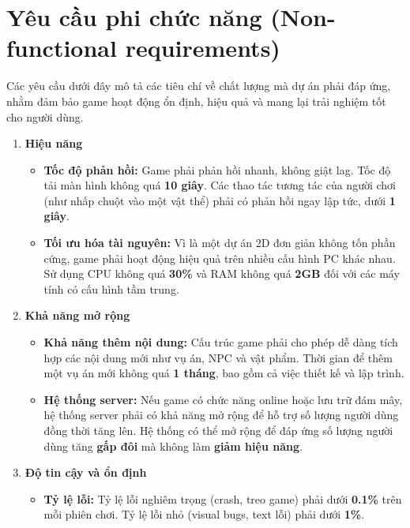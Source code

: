 \section{Yêu cầu phi chức năng (Non-functional requirements)}
Các yêu cầu dưới đây mô tả các tiêu chí về chất lượng mà dự án phải đáp ứng, nhằm đảm bảo game hoạt động ổn định, hiệu quả và mang lại trải nghiệm tốt cho người dùng.

\begin{enumerate}
    \item \textbf{Hiệu năng}
    \begin{itemize}
        \item \textbf{Tốc độ phản hồi:} 
        Game phải phản hồi nhanh, không giật lag. Tốc độ tải màn hình không quá \textbf{10 giây}. Các thao tác tương tác của người chơi (như nhấp chuột vào một vật thể) phải có phản hồi ngay lập tức, dưới \textbf{1 giây}.

        \item \textbf{Tối ưu hóa tài nguyên:}
        Vì là một dự án 2D đơn giản không tốn phần cứng, game phải hoạt động hiệu quả trên nhiều cấu hình PC khác nhau. Sử dụng CPU không quá \textbf{30\%} và RAM không quá \textbf{2GB} đối với các máy tính có cấu hình tầm trung.
    \end{itemize}

    \item \textbf{Khả năng mở rộng}
    \begin{itemize}
        \item \textbf{Khả năng thêm nội dung:}
        Cấu trúc game phải cho phép dễ dàng tích hợp các nội dung mới như vụ án, NPC và vật phẩm. Thời gian để thêm một vụ án mới không quá \textbf{1 tháng}, bao gồm cả việc thiết kế và lập trình.

        \item \textbf{Hệ thống server:}
        Nếu game có chức năng online hoặc lưu trữ đám mây, hệ thống server phải có khả năng mở rộng để hỗ trợ số lượng người dùng đồng thời tăng lên. Hệ thống có thể mở rộng để đáp ứng số lượng người dùng tăng \textbf{gấp đôi} mà không làm \textbf{giảm hiệu năng}.
    \end{itemize}

    \item \textbf{Độ tin cậy và ổn định}
    \begin{itemize}
        \item \textbf{Tỷ lệ lỗi:} Tỷ lệ lỗi nghiêm trọng (crash, treo game) phải dưới \textbf{0.1\%} trên mỗi phiên chơi. Tỷ lệ lỗi nhỏ (visual bugs, text lỗi) phải dưới \textbf{1\%}.


\end{itemize}
\end{enumerate}
